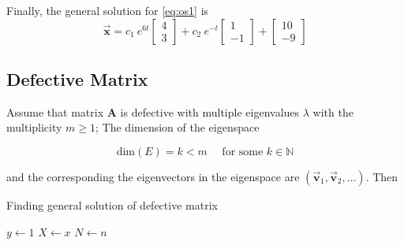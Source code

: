 \begin{solution}
    Finally, the general solution for \eqref{eq:os1} is 
    \begin{equation*}
        \overrightarrow{\mathbf{x}} = c_1 \> e^{6t} \begin{bmatrix}
            4 \\ 3
        \end{bmatrix} + c_2 \> e^{-t} \begin{bmatrix}
            1 \\ -1
        \end{bmatrix}
        + \begin{bmatrix}
            10 \\ -9
        \end{bmatrix}
    \end{equation*}
\end{solution}

\subsection{Defective Matrix}

\begin{theorem}
    Assume that matrix $\mathbf{A}$ is defective with multiple eigenvalues $\lambda$ with 
    the multiplicity $m \geq 1$; The dimension of the eigenspace 

    \begin{equation}
        \text{dim}(E) = k < m \quad \text{ for some } k \in \mathbb{N}
    \end{equation}

    and the corresponding the eigenvectors in the eigenspace are $(\overrightarrow{\mathbf{v}}_1, 
    \overrightarrow{\mathbf{v}}_2, \ldots)$. Then 
\end{theorem}

\begin{algorithm}
    \caption{Finding general solution of defective matrix}\label{alg:defective}
    $y \gets 1$\;
    $X \gets x$\;
    $N \gets n$\;
\end{algorithm}

